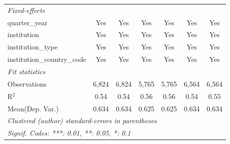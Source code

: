 \begin{tabular}{lcccccc}
   \midrule
   \emph{Fixed-effects}\\
   quarter\_year                      & Yes     & Yes         & Yes     & Yes            & Yes     & Yes\\  
   institution                        & Yes     & Yes         & Yes     & Yes            & Yes     & Yes\\  
   institution\_type                  & Yes     & Yes         & Yes     & Yes            & Yes     & Yes\\  
   institution\_country\_code         & Yes     & Yes         & Yes     & Yes            & Yes     & Yes\\  
   \midrule
   \emph{Fit statistics}\\
   Observations                       & 6,824   & 6,824       & 5,765   & 5,765          & 6,564   & 6,564\\  
   R$^2$                              & 0.54    & 0.54        & 0.56    & 0.56           & 0.54    & 0.55\\  
Mean(Dep. Var.) & 0.634 & 0.634 & 0.625 & 0.625 & 0.634 & 0.634 \\
   \midrule \midrule
   \multicolumn{7}{l}{\emph{Clustered (author) standard-errors in parentheses}}\\
   \multicolumn{7}{l}{\emph{Signif. Codes: ***: 0.01, **: 0.05, *: 0.1}}\\
\end{tabular}
\par\endgroup
